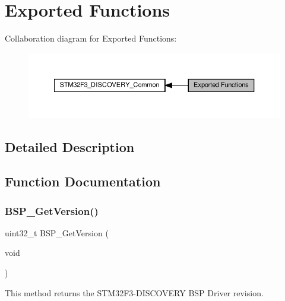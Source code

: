 \hypertarget{group__STM32F3__DISCOVERY__Exported__Functions}{}\section{Exported Functions}
\label{group__STM32F3__DISCOVERY__Exported__Functions}
Collaboration diagram for Exported Functions\+:\nopagebreak
\begin{figure}[H]
\begin{center}
\leavevmode
\includegraphics[width=350pt]{group__STM32F3__DISCOVERY__Exported__Functions}
\end{center}
\end{figure}


\subsection{Detailed Description}


\subsection{Function Documentation}
\mbox{\label{group__STM32F3__DISCOVERY__Exported__Functions_ga88eb8fe79668f12714ed74ed9ad661ff}} 
\subsubsection{\texorpdfstring{B\+S\+P\+\_\+\+Get\+Version()}{BSP\_GetVersion()}}
{\footnotesize\ttfamily uint32\+\_\+t B\+S\+P\+\_\+\+Get\+Version (\begin{DoxyParamCaption}\item[{void}]{ }\end{DoxyParamCaption})}



This method returns the S\+T\+M32\+F3-\/\+D\+I\+S\+C\+O\+V\+E\+RY B\+SP Driver revision. 


